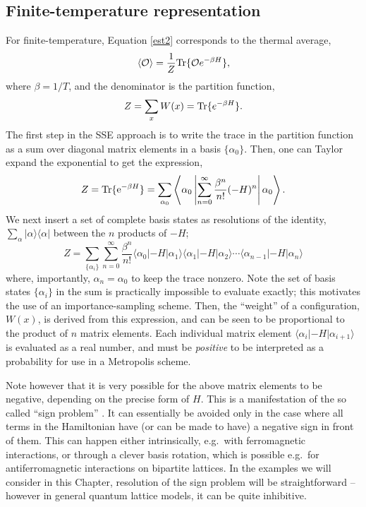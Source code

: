 \documentclass[vecphys]{svmult}
\begin{document}
\subsection{Finite-temperature representation} \label{finiteT}

For finite-temperature, Equation \ref{est2} corresponds to the thermal average,
\begin{equation}
\langle \mathcal{O} \rangle  = \frac{1}{Z} {\rm Tr} \{ \mathcal{O} e^{- \beta H} \}, \label{finiteTmeas}
\end{equation}
where $\beta = 1/T$, and the denominator is the partition function,
\begin{equation}
Z = \sum_x W(x) = {\rm Tr} \{ e^{- \beta H} \}. \label{MarkZ}
\end{equation}
The first step in the SSE approach is to write the trace in the partition function as a sum over diagonal matrix elements in a basis $\{ \alpha_0 \}$.  Then, one can Taylor expand the exponential to get the expression,
\begin{equation}
Z={\rm Tr} \{ {\rm e}^{-\beta H} \}=\sum_{\alpha_0} \left\langle{ \alpha_0 \left|{ \sum_{n=0}^{\infty} \frac{ \beta^n}{n !} (-H)^n} \right| \alpha_0   }\right\rangle.
 \label{Zsse1}
\end{equation}
We next insert a set of complete basis states as resolutions of the identity, $\sum_{\alpha} |\alpha \rangle  \langle \alpha |$ between the $n$ products of $-H$;
\begin{equation}
 Z=\sum_{\{ \alpha_i \}} \sum_{n=0}^{\infty} \frac{\beta^n}{n !} 
\langle \alpha_{0} | -H | \alpha_{1} \rangle \langle \alpha_1 | -H | \alpha_2\rangle  \cdots \langle \alpha_{n-1} | -H| \alpha_{n} \rangle
\label{Zsse2}
\end{equation}
where, importantly,  $\alpha_{n}=\alpha_0$ to keep the trace nonzero.  
Note the set of basis states $\{ \alpha_i \}$ in the sum is practically impossible to evaluate exactly; this motivates the use of an importance-sampling scheme.  Then,
the ``weight'' of a configuration, $W(x)$, is derived from this expression, and can be seen to be proportional to the product of $n$ matrix elements.  Each individual matrix element $\langle{\alpha_{i} \left| {-H} \right| \alpha_{i+1}   }\rangle$ is evaluated as a real number, and must be {\em positive} to be interpreted as a probability  for use in a Metropolis scheme.  

Note however that it is very possible for the above matrix elements to be negative, depending on the precise form of $H$.
This is a manifestation of the so called ``sign problem'' \cite{Melko:Henelius00}.  It can 
essentially be avoided only in the case where all terms in the Hamiltonian have (or can be made to have) a negative sign in front of them. 
This can happen either intrinsically, e.g.~with ferromagnetic interactions, or through a clever basis rotation, which is possible e.g.~for antiferromagnetic interactions on bipartite lattices.  In the examples we will consider in this Chapter, resolution of the sign problem will be straightforward -- however in general quantum lattice models, it can be quite inhibitive.
\end{document}
